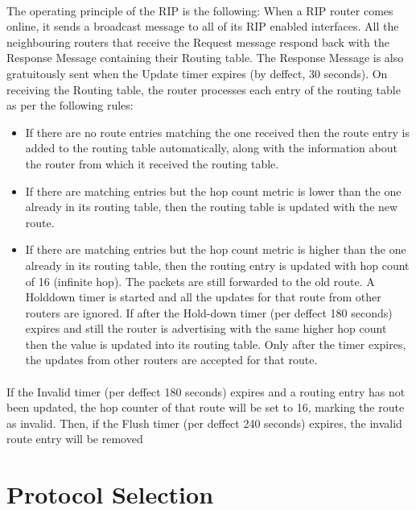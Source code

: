 \documentclass[12pt,a4paper]{report}
\begin{document}
\paragraph{}The operating principle of the RIP is the following: When a RIP router comes online, it sends a broadcast message to all of its RIP enabled interfaces. All the neighbouring routers that receive the Request message respond back with the Response Message containing their Routing table. The Response Message is also gratuitously sent when the Update timer expires (by deffect, 30 seconds). On receiving the Routing table, the router processes each entry of the routing table as per the following rules:
\begin{itemize}
\item{} If there are no route entries matching the one received then the route entry is added to the routing table automatically, along with the information about the router from which it received the routing table.
\item{} If there are matching entries but the hop count metric is lower than the one already in its routing table, then the routing table is updated with the new route.
\item{} If there are matching entries but the hop count metric is higher than the one already in its routing table, then the routing entry is updated with hop count of 16 (infinite hop). The packets are still forwarded to the old route. A Holddown timer is started and all the updates for that route from other routers are ignored. If after the Hold-down timer (per deffect 180 seconds) expires and still the router is advertising with the same higher hop count then the value is updated into its routing table. Only after the timer expires, the updates from other routers are accepted for that route.
\end{itemize}
\paragraph{}If the Invalid timer (per deffect 180 seconds) expires and a routing entry has not been updated, the hop counter of that route will be set to 16, marking the route as invalid. Then, if the Flush timer (per deffect 240 seconds) expires, the invalid route entry will be removed

\section{Protocol Selection}
\end{document}
